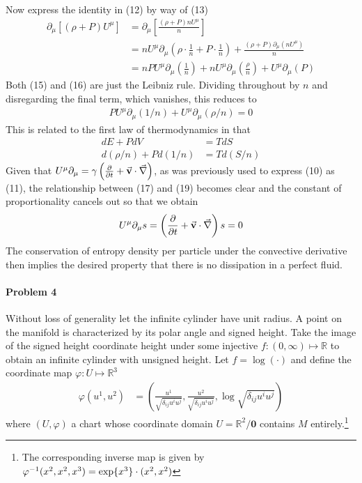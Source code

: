 \documentclass[10pt]{scrartcl}
\begin{document}
Now express the identity in (12) by way of (13)
\begin{align}
	\partial_\mu[(\rho + P)U^{\mu}] &= \partial_{\mu}\left[\frac{(\rho+P)n U^{\mu}}{n}\right]\\
	&= n U^{\mu}\partial_{\mu}\left(\rho\cdot\frac{1}{n} + P\cdot\frac{1}{n}\right) + \frac{(\rho+P)\partial_{\mu}( n U^{\mu})}{n} \\
	&=nPU^{\mu}\partial_{\mu}\left(\frac{1}{n}\right)+nU^{\mu}\partial_{\mu}\left(\frac{\rho}{n}\right) + U^{\mu}\partial_{\mu}(P) 
\end{align}
Both (15) and (16) are just the Leibniz rule. Dividing throughout by $n$ and disregarding the final term, which vanishes, this reduces to
\begin{align}
PU^{\mu}\partial_{\mu}\left(1/n\right)+U^{\mu}\partial_{\mu}\left(\rho/ n\right) = 0
\end{align}
This is related to the first law of thermodynamics in that
\begin{align}
dE + P dV &= T dS \\
d(\rho/n) + P d(1/n) &= T d(S/n)
\end{align}
Given that $U^{\mu}\partial_{\mu} = \gamma\left(\pdv{t}+\va{v}\cdot\va{\nabla}\right)$, as was previously used to express (10) as (11), the relationship between (17) and (19) becomes clear and the constant of proportionality cancels out so that we obtain
\begin{align}
U^{\mu}\partial_{\mu} s = \left(\pdv{t} + \va{v}\cdot\va{\nabla}\right) s = 0	
\end{align}
The conservation of entropy density per particle under the convective derivative then implies the desired property that there is no dissipation in a perfect fluid.  





\paragraph{Problem 4}
Without loss of generality let the infinite cylinder have unit radius. A point on the manifold is characterized by its polar angle and signed height. Take the image of the signed height coordinate height under some injective $f: (0, \infty)\mapsto \mathbb{R}$ to obtain an infinite cylinder with unsigned height. Let $f=\log(\cdot)$ and define the coordinate map $\varphi: U\mapsto \mathbb{R}^3$
\begin{align}
\varphi(u^1, u^2) &= \left(\frac{u^1}{\sqrt{\delta_{ij}u^i u^j}},\frac{u^2}{\sqrt{\delta_{ij}u^i u^j}}, \log\sqrt{\delta_{ij}u^i u^j}\right)
\end{align}
where $(U,\varphi)$ a chart whose coordinate domain $U=\mathbb{R}^2/{\mathbf{0}}$ contains $M$ entirely.\footnote{The corresponding inverse map is given by $\varphi^{-1}(x^2, x^2, x^3) = \exponential\{x^3\}\cdot(x^2, x^2)$}
\end{document}
